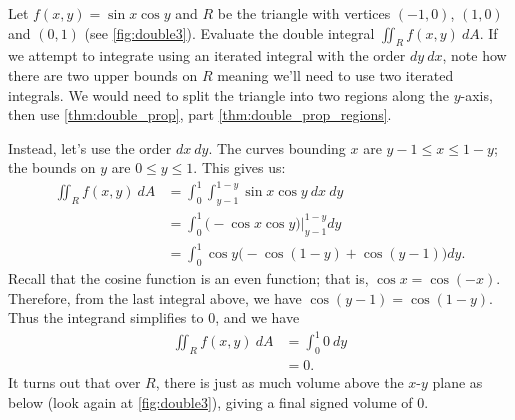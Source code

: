 \begin{example}\label{ex_double3}
Let $f(x,y) = \sin x\cos y$ and $R$ be the triangle with vertices $(-1,0)$, $(1,0)$ and $(0,1)$ (see \autoref{fig:double3}). Evaluate the double integral $\iint_Rf(x,y)\ dA$.
%
\solution
If we attempt to integrate using an iterated integral with the order $dy\ dx$, note how there are two upper bounds on $R$ meaning we'll need to use two iterated integrals. We would need to split the triangle into two regions along the $y$-axis, then use \autoref{thm:double_prop}, part \ref{thm:double_prop_regions}.

Instead, let's use the order $dx\ dy$. The curves bounding $x$ are $y-1\leq x\leq 1-y$; the bounds on $y$ are $0\leq y\leq 1$. This gives us:
\begin{align*}
\iint_R f(x,y)\ dA &= \int_0^1\int_{y-1}^{1-y}\sin x\cos y\ dx\ dy\\
		&= \int_0^1\left.\Big( -\cos x\cos y\Big)\right|_{y-1}^{1-y}dy\\
		&= \int_0^1 \cos y\Big(-\cos (1-y) + \cos(y-1)\Big)dy.
\end{align*}
Recall that the cosine function is an even function; that is, $\cos x = \cos (-x)$. Therefore, from the last integral above, we have $\cos (y-1) = \cos (1-y)$. Thus the integrand simplifies to 0, and we have 
\begin{align*}
\iint_R f(x,y)\ dA &= \int_0^1 0\ dy \\
&= 0.
\end{align*}
It turns out that over $R$, there is just as much volume above the $x$-$y$ plane as below (look again at \autoref{fig:double3}), giving a final signed volume of 0.
\end{example}

